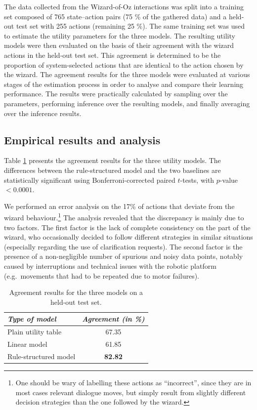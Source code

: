 The data collected from the Wizard-of-Oz interactions was split into a training set composed of 765 state--action pairs (75 \% of the gathered data) and a held-out test set with 255 actions (remaining 25 \%). The same training set was used to estimate the utility parameters for the three models.  The resulting utility models were then evaluated on the basis of their agreement with the wizard actions in the held-out test set. This agreement is determined to be the proportion of system-selected actions that are identical to the action chosen by the wizard. The agreement results for the three models were evaluated at various stages of the estimation process in order to analyse and compare their learning performance. The results were practically calculated by sampling over the parameters, performing inference over the resulting models, and finally averaging over the inference results.  

\subsection{Empirical results and analysis}
\label{sec:wozlearning-experiments-results}

Table \ref{table} presents the agreement results for the three utility models. The differences between the rule-structured model and the two baselines are statistically significant using Bonferroni-corrected paired $t$-tests, with $p$-value $< 0.0001$.   

We performed an error analysis on the 17\% of actions that deviate from the wizard behaviour.\footnote{One should be wary of labelling these actions as ``incorrect'', since they are in most cases relevant dialogue moves, but simply result from slightly different decision strategies than the one followed by the wizard.} The analysis revealed that the discrepancy is mainly due to two factors.  The first factor is the lack of complete consistency on the part of the wizard, who occasionally decided to follow different strategies in similar situations (especially regarding the use of clarification requests). The second factor is the presence of a non-negligible number of spurious and noisy data points, notably caused by interruptions and technical issues with the robotic platform (e.g.\ movements that had to be repeated due to motor failures).

\begin{table}[ht]
\begin{center}
\begin{tabular}{|l|c|} \hline
\textit{Type of model} & \textit{Agreement (in \%) } \\ \hline \hline
Plain utility table & 67.35 \\ \hline
Linear model & 61.85 \\ \hline
Rule-structured model & \textbf{82.82} \\ \hline
\end{tabular}
\end{center}
\vspace{-2mm}
\caption{Agreement results for the three models on a held-out test set.}
\vspace{-2mm}
\label{table}
\end{table}

